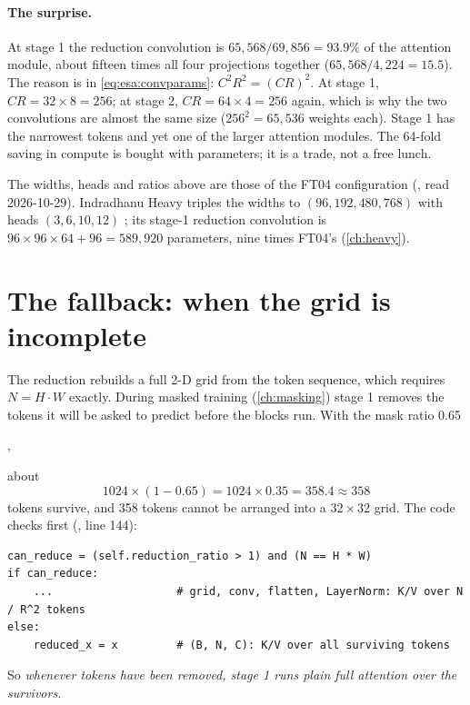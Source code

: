 \paragraph{The surprise.} At stage 1 the reduction convolution is $65{,}568/69{,}856 = 93.9\%$ of
the attention module, about fifteen times all four projections together
($65{,}568/4{,}224 = 15.5$). The reason is in \cref{eq:esa:convparams}: $C^2R^2 = (CR)^2$. At
stage 1, $CR = 32\times8 = 256$; at stage 2, $CR = 64\times4 = 256$ again, which is why the two
convolutions are almost the same size ($256^2 = 65{,}536$ weights each). Stage 1 has the narrowest
tokens and yet one of the larger attention modules. The 64-fold saving in compute is bought with
parameters; it is a trade, not a free lunch.

\begin{drift}
The widths, heads and ratios above are those of the FT04 configuration
(, read 2026-10-29).
Indradhanu Heavy triples the widths to $(96, 192, 480, 768)$ with heads $(3, 6, 10, 12)$
; its stage-1 reduction convolution is
$96\times96\times64 + 96 = 589{,}920$ parameters\tagC, nine times FT04's (\cref{ch:heavy}).
\end{drift}

\section{The fallback: when the grid is incomplete}\label{sec:esa:fallback}

The reduction rebuilds a full 2-D grid from the token sequence, which requires $N = H\cdot W$
exactly. During masked training (\cref{ch:masking}) stage 1 removes the tokens it will be asked to
predict before the blocks run. With the mask ratio 0.65
\par\noindent{},
\par\noindent about
\[
  1024\times(1 - 0.65) = 1024\times0.35 = 358.4 \approx 358
\]
tokens survive, and 358 tokens cannot be arranged into a $32\times32$ grid. The code checks first
(, line 144):
\begin{lstlisting}
can_reduce = (self.reduction_ratio > 1) and (N == H * W)
if can_reduce:
    ...                   # grid, conv, flatten, LayerNorm: K/V over N / R^2 tokens
else:
    reduced_x = x         # (B, N, C): K/V over all surviving tokens
\end{lstlisting}
So \emph{whenever tokens have been removed, stage 1 runs plain full attention over the
survivors.}

